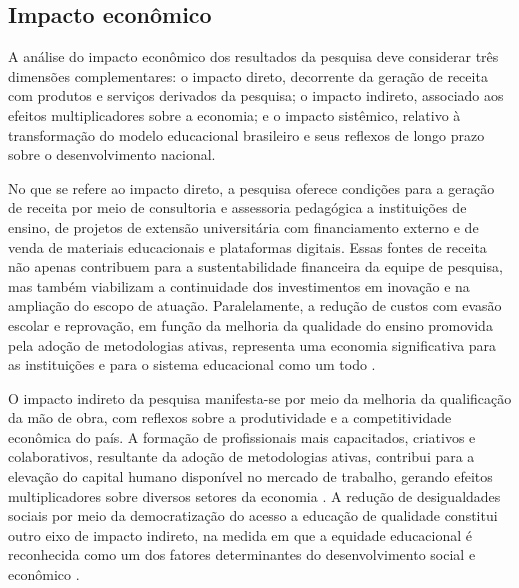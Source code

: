 \subsection{Impacto econômico}
\label{subsec:impacto_economico}

A análise do impacto econômico dos resultados da pesquisa deve considerar três dimensões complementares: o impacto direto, decorrente da geração de receita com produtos e serviços derivados da pesquisa; o impacto indireto, associado aos efeitos multiplicadores sobre a economia; e o impacto sistêmico, relativo à transformação do modelo educacional brasileiro e seus reflexos de longo prazo sobre o desenvolvimento nacional.

No que se refere ao impacto direto, a pesquisa oferece condições para a geração de receita por meio de consultoria e assessoria pedagógica a instituições de ensino, de projetos de extensão universitária com financiamento externo e de venda de materiais educacionais e plataformas digitais. Essas fontes de receita não apenas contribuem para a sustentabilidade financeira da equipe de pesquisa, mas também viabilizam a continuidade dos investimentos em inovação e na ampliação do escopo de atuação. Paralelamente, a redução de custos com evasão escolar e reprovação, em função da melhoria da qualidade do ensino promovida pela adoção de metodologias ativas, representa uma economia significativa para as instituições e para o sistema educacional como um todo \cite{LIBANEO2006}.

O impacto indireto da pesquisa manifesta-se por meio da melhoria da qualificação da mão de obra, com reflexos sobre a produtividade e a competitividade econômica do país. A formação de profissionais mais capacitados, criativos e colaborativos, resultante da adoção de metodologias ativas, contribui para a elevação do capital humano disponível no mercado de trabalho, gerando efeitos multiplicadores sobre diversos setores da economia \cite{BACICH2018}. A redução de desigualdades sociais por meio da democratização do acesso a educação de qualidade constitui outro eixo de impacto indireto, na medida em que a equidade educacional é reconhecida como um dos fatores determinantes do desenvolvimento social e econômico \cite{VEIGA2014}.

